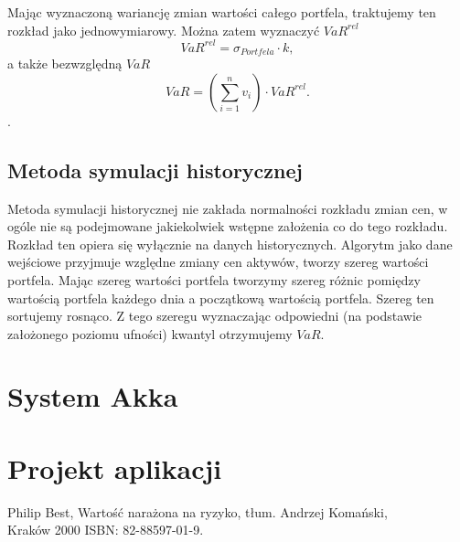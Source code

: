 \documentclass[11pt,titlepage]{article}
\numberwithin{equation}{section}
\begin{document}
Mając wyznaczoną wariancję zmian wartości całego portfela, traktujemy ten rozkład jako jednowymiarowy. Można zatem wyznaczyć $VaR^{rel}$
$$VaR^{rel}=\sigma_{Portfela} \cdot k,$$
a także bezwzględną $VaR$
$$VaR = (\sum_{i=1}^{n}v_i) \cdot VaR^{rel}.$$.



\subsection{Metoda symulacji historycznej}



Metoda symulacji historycznej nie zakłada normalności rozkładu zmian cen, w ogóle nie są podejmowane jakiekolwiek wstępne założenia co do tego rozkładu. Rozkład ten opiera się wyłącznie na danych historycznych. Algorytm jako dane wejściowe przyjmuje względne zmiany cen aktywów, tworzy szereg wartości portfela. Mając szereg wartości portfela tworzymy szereg różnic pomiędzy wartością portfela każdego dnia a początkową wartością portfela. Szereg ten sortujemy rosnąco. Z tego szeregu wyznaczając odpowiedni (na podstawie założonego poziomu ufności) kwantyl otrzymujemy $VaR$.\\









\newpage
\section{System Akka}


\section{Projekt aplikacji}




\newpage



Philip Best, Wartość narażona na ryzyko, tłum. Andrzej Komański,
\\
Kraków 2000 ISBN: 82-88597-01-9.
\end{document}
